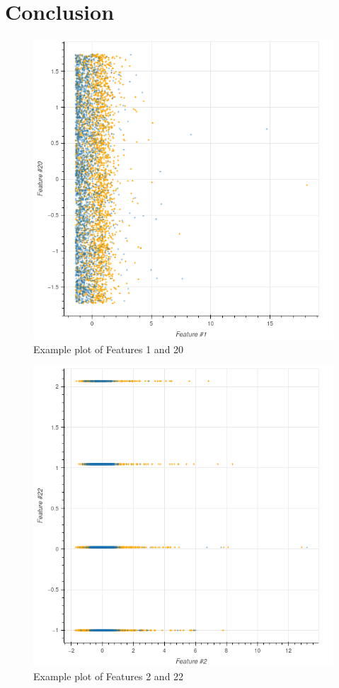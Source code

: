 \documentclass[10pt,conference,compsocconf]{IEEEtran}
\begin{document}
\section{Conclusion}

\begin{figure}
	\includegraphics[width=\columnwidth]{f1-f20.png}
	\caption{Example plot of Features 1 and 20}
	\label{f1-f20}
\end{figure}

\begin{figure}
	\includegraphics[width=\columnwidth]{f2-f22.png}
	\caption{Example plot of Features 2 and 22}
	\label{f2-f22}
\end{figure}



\end{document}
